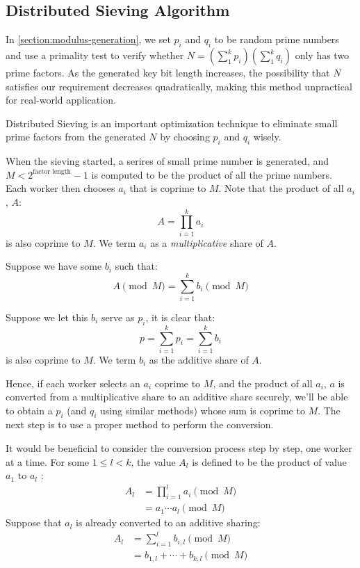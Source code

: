 \subsection{Distributed Sieving Algorithm}

In \cref{section:modulus-generation}, we set $p_i$ and $q_i$ to be random prime numbers and use a primality test to verify whether $N = \left( \sum_1^k p_i\right) \left( \sum_1^k q_i \right)$ only has two prime factors. As the generated key bit length increases, the possibility that $N$ satisfies our requirement decreases quadratically, making this method unpractical for real-world application.

Distributed Sieving is an important optimization technique to eliminate small prime factors from the generated $N$ by choosing $p_i$ and $q_i$ wisely.

When the sieving started, a serires of small prime number is generated, and $M < 2^{\text{factor length}} - 1$ is computed to be the product of all the prime numbers. Each worker then chooses $a_i$ that is coprime to $M$. Note that the product of all $a_i$, $A$:
\begin{equation}
  A = \prod_{i=1}^{k}a_i
\end{equation}
is also coprime to $M$. We term $a_i$ as a \textit{multiplicative} share of $A$.

Suppose we have some $b_i$ such that:
\begin{equation}
  A \pmod{M} = \sum_{i=1}^k b_i \pmod{M}
\end{equation}

Suppose we let this $b_i$ serve as $p_i$, it is clear that:
\begin{equation}
  p = \sum_{i=1}^k p_i  = \sum_{i=1}^k b_i
\end{equation}
is also coprime to $M$. We term $b_i$ as the additive share of $A$.

Hence, if each worker selects an $a_i$ coprime to $M$, and the product of all $a_i$, $a$ is converted from a multiplicative share to an additive share securely, we'll be able to obtain a $p_i$ (and $q_i$ using similar methods) whose sum is coprime to $M$. The next step is to use a proper method to perform the conversion.

It would be beneficial to consider the conversion process step by step, one worker at a time. For some $1 \leq l < k$, the value $A_l$ is defined to be the product of value $a_1$ to $a_l$ :
\begin{equation}
  \begin{split}
    A_l &= \prod_{i=1}^l a_i \pmod{M} \\
        &= a_1 \cdots a_l \pmod{M}
  \end{split}
\end{equation}
Suppose that $a_l$ is already converted to an additive sharing:
\begin{equation}
  \begin{split}
    A_l &= \sum_{i=1}^{l} b_{i,l} \pmod{M} \\
        &= b_{1,l} + \cdots + b_{k,l} \pmod{M}
  \end{split}
\end{equation}


